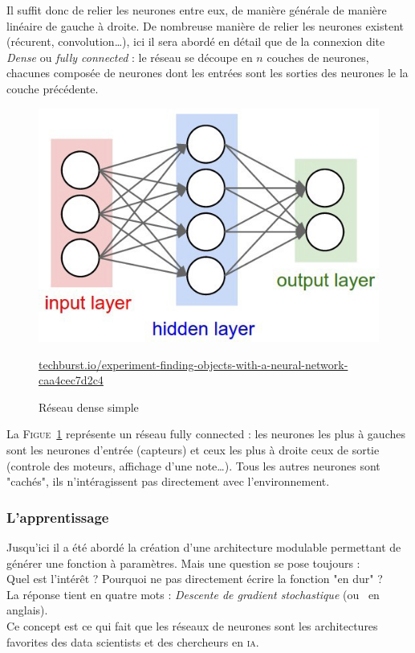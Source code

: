 Il suffit donc de relier les neurones entre eux, de manière générale de manière linéaire de gauche à droite.
De nombreuse manière de relier les neurones existent (récurent, convolution\ldots),
ici il sera abordé en détail que de la connexion dite \emph{Dense} ou \emph{fully connected} :
le réseau se découpe en $n$ couches de neurones,
chacunes composée de neurones dont les entrées sont les sorties des neurones le la couche précédente.
\begin{figure}[H]
    \center
    \includegraphics[height=\moyen]{pict/net1.jpeg}
	\caption{Réseau dense simple}
    {\tiny \url{techburst.io/experiment-finding-objects-with-a-neural-network-caa4cec7d2c4}}
	\label{fig:simple-dense}
\end{figure}
La \textsc{Figue}\ \ref{fig:simple-dense} représente un réseau fully connected :
les neurones les plus à gauches sont les neurones d'entrée (capteurs)
et ceux les plus à droite ceux de sortie (controle des moteurs, affichage d'une note\ldots).
Tous les autres neurones sont "cachés", ils n'intéragissent pas directement avec l'environnement.


\subsubsection{L'apprentissage}
Jusqu'ici il a été abordé la création d'une architecture modulable permettant de générer une fonction à paramètres.
Mais une question se pose toujours :\\
Quel est l'intérêt ?
Pourquoi ne pas directement écrire la fonction "en dur" ?\\
La réponse tient en quatre mots : \textit{Descente de gradient stochastique} (ou  \sgd\ en anglais). \\
Ce concept est ce qui fait que les réseaux de neurones sont les architectures favorites
des data scientists et des chercheurs en \textsc{ia}.\\


